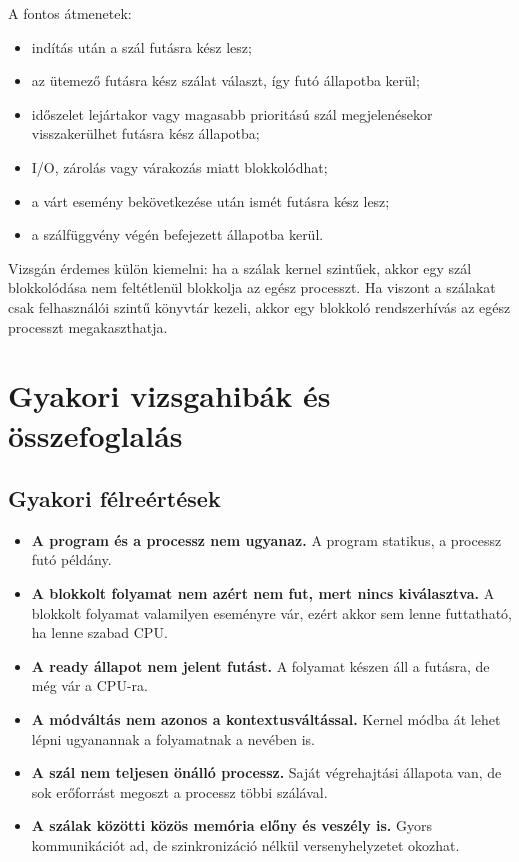 A fontos átmenetek:

\begin{itemize}
  \item indítás után a szál futásra kész lesz;
  \item az ütemező futásra kész szálat választ, így futó állapotba kerül;
  \item időszelet lejártakor vagy magasabb prioritású szál megjelenésekor visszakerülhet futásra kész állapotba;
  \item I/O, zárolás vagy várakozás miatt blokkolódhat;
  \item a várt esemény bekövetkezése után ismét futásra kész lesz;
  \item a szálfüggvény végén befejezett állapotba kerül.
\end{itemize}

\begin{warningbox}
Vizsgán érdemes külön kiemelni: ha a szálak kernel szintűek, akkor egy szál blokkolódása nem feltétlenül blokkolja az egész processzt. Ha viszont a szálakat csak felhasználói szintű könyvtár kezeli, akkor egy blokkoló rendszerhívás az egész processzt megakaszthatja.
\end{warningbox}

\section{Gyakori vizsgahibák és összefoglalás}

\subsection{Gyakori félreértések}

\begin{itemize}
  \item \textbf{A program és a processz nem ugyanaz.} A program statikus, a processz futó példány.
  \item \textbf{A blokkolt folyamat nem azért nem fut, mert nincs kiválasztva.} A blokkolt folyamat valamilyen eseményre vár, ezért akkor sem lenne futtatható, ha lenne szabad CPU.
  \item \textbf{A ready állapot nem jelent futást.} A folyamat készen áll a futásra, de még vár a CPU-ra.
  \item \textbf{A módváltás nem azonos a kontextusváltással.} Kernel módba át lehet lépni ugyanannak a folyamatnak a nevében is.
  \item \textbf{A szál nem teljesen önálló processz.} Saját végrehajtási állapota van, de sok erőforrást megoszt a processz többi szálával.
  \item \textbf{A szálak közötti közös memória előny és veszély is.} Gyors kommunikációt ad, de szinkronizáció nélkül versenyhelyzetet okozhat.
\end{itemize}


